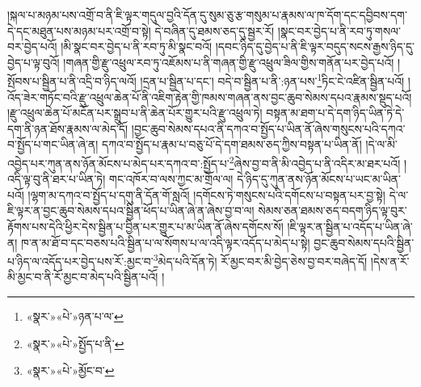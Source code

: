 །སྐལ་པ་མཉམ་པས་འགྲོ་བ་ནི་ཇི་ལྟར་གདུལ་བྱའི་དོན་དུ་སུམ་ཅུ་རྩ་གསུམ་པ་རྣམས་ལ་ཁ་དོག་དང་དབྱིབས་དག་དེ་དང་མཐུན་པས་མཉམ་པར་འགྲོ་བ་སྟེ། དེ་བཞིན་དུ་ཐམས་ཅད་དུ་སྦྱར་རོ། །སྣང་བར་བྱེད་པ་ནི་རབ་ཏུ་གསལ་བར་བྱེད་པའོ། །མི་སྣང་བར་བྱེད་པ་ནི་རབ་ཏུ་མི་སྣང་བའོ། །དབང་ཉིད་དུ་བྱེད་པ་ནི་ཇི་ལྟར་བདུད་སངས་རྒྱས་ཉིད་དུ་བྱེད་པ་ལྟ་བུའོ། །གཞན་གྱི་རྫུ་འཕྲུལ་རབ་ཏུ་འཇོམས་པ་ནི་གཞན་གྱི་རྫུ་འཕྲུལ་ཟིལ་གྱིས་གནོན་པར་བྱེད་པའོ། །སྤོབས་པ་སྦྱིན་པ་ནི་འདྲི་བ་ཉིད་ལའོ། །དྲན་པ་སྦྱིན་པ་དང་། བདེ་བ་སྦྱིན་པ་ནི་:ཉན་པས་\footnote{«སྣར་»«པེ་»ཉན་པ་ལ་}ཏིང་ངེ་འཛིན་སྦྱིན་པའོ། །འོད་ཟེར་གཏོང་བའི་རྫུ་འཕྲུལ་ཆེན་པོ་ནི་འཇིག་རྟེན་གྱི་ཁམས་གཞན་ནས་བྱང་ཆུབ་སེམས་དཔའ་རྣམས་སྡུད་པའོ། །རྫུ་འཕྲུལ་ཆེན་པོ་མངོན་པར་སྒྲུབ་པ་ནི་ཆེན་པོར་གྱུར་པའི་རྫུ་འཕྲུལ་ཏེ། བསྟན་མ་ཐག་པ་དེ་དག་ཉིད་ཡིན་ཏེ་དེ་དག་ནི་ཉན་ཐོས་རྣམས་ལ་མེད་དོ། །བྱང་ཆུབ་སེམས་དཔའ་ནི་དཀའ་བ་སྤྱོད་པ་ཡིན་ནོ་ཞེས་གསུངས་པའི་དཀའ་བ་སྤྱོད་པ་གང་ཡིན་ཞེ་ན། དཀའ་བ་སྤྱོད་པ་རྣམ་པ་བཅུ་པོ་དེ་དག་ཐམས་ཅད་ཀྱིས་བསྟན་པ་ཡིན་ནོ། །དེ་ལ་མི་འབྱེད་པར་ཀུན་ནས་ཉོན་མོངས་པ་མེད་པར་དཀའ་བ་:སྤྱོད་པ་\footnote{«སྣར་»«པེ་»སྤྱོད་པ་ནི་}ཞེས་བྱ་བ་ནི་མི་འབྱེད་པ་ནི་འདིར་མ་ཐར་པའོ། །འདི་ལྟ་བུ་ནི་ཐར་པ་ཡིན་ཏེ། གང་འཁོར་བ་ལས་ཀྱང་མ་གྲོལ་ལ། དེ་ཉིད་དུ་ཀུན་ནས་ཉོན་མོངས་པ་ཡང་མ་ཡིན་པའོ། །ལྷག་མ་དཀའ་བ་སྤྱོད་པ་དགུ་ནི་དོན་གོ་སླའོ། །དགོངས་ཏེ་གསུངས་པའི་དགོངས་པ་བསྟན་པར་བྱ་སྟེ། དེ་ལ་ཇི་ལྟར་ན་བྱང་ཆུབ་སེམས་དཔའ་སྦྱིན་ཕོད་པ་ཡིན་ཞེ་ན་ཞེས་བྱ་བ་ལ། སེམས་ཅན་ཐམས་ཅད་བདག་ཉིད་ལྟ་བུར་རྟོགས་པས་དེའི་ཕྱིར་དེས་སྦྱིན་པ་བྱིན་པར་གྱུར་པ་མ་ཡིན་ནོ་ཞེས་དགོངས་སོ། །ཇི་ལྟར་ན་སྦྱིན་པ་འདོད་པ་ཡིན་ཞེ་ན། ཁ་ན་མ་ཐོ་བ་དང་བཅས་པའི་སྦྱིན་པ་ལ་སོགས་པ་ལ་འདི་ལྟར་འདོད་པ་མེད་པ་སྟེ། བྱང་ཆུབ་སེམས་དཔའི་སྦྱིན་པ་ཉིད་ལ་འདོད་པར་བྱེད་པས་རོ་:མྱང་བ་\footnote{«སྣར་»«པེ་»མྱོང་བ་}མེད་པའི་དོན་ཏེ། རོ་མྱང་བར་མི་བྱེད་ཅེས་བྱ་བར་བཞེད་དོ། །དེས་ན་རོ་མི་མྱང་བ་ནི་རོ་མྱང་བ་མེད་པའི་སྦྱིན་པའོ། །
